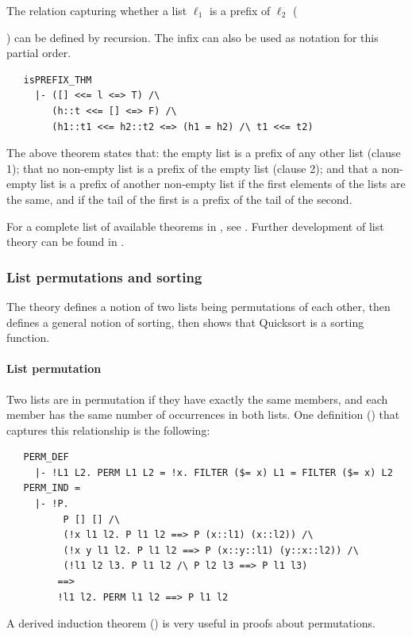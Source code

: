 The relation capturing whether a list $\ell_1$ is a prefix of $\ell_2$
({) can be defined by recursion. The infix
\holtxt{<{}<=} can also be used as notation for this partial order.
%
\begin{hol}
\begin{verbatim}
   isPREFIX_THM
     |- ([] <<= l <=> T) /\
        (h::t <<= [] <=> F) /\
        (h1::t1 <<= h2::t2 <=> (h1 = h2) /\ t1 <<= t2)
\end{verbatim}
\end{hol}
The above theorem states that: the empty list is a prefix of any other
list (clause 1); that no non-empty list is a prefix of the empty list
(clause 2); and that a non-empty list is a prefix of another non-empty
list if the first elements of the lists are the same, and if the tail
of the first is a prefix of the tail of the second.

\vspace{1ex}
\noindent For a complete list of available theorems in
, see \REFERENCE.  Further development of list
theory can be found in \theoryimp{rich\_list}.


\subsubsection{List permutations and sorting}

The \theoryimp{sorting} theory defines a notion of two lists being
permutations of each other, then defines a general notion of sorting,
then shows that Quicksort is a sorting function.

\paragraph{List permutation}

Two lists are in permutation if they have exactly the same members,
and each member has the same number of occurrences in both lists. One
definition (\holtxt{PERM}) that captures this relationship is the
following:
%
\begin{hol}
\begin{verbatim}
   PERM_DEF
     |- !L1 L2. PERM L1 L2 = !x. FILTER ($= x) L1 = FILTER ($= x) L2
   PERM_IND =
     |- !P.
          P [] [] /\
          (!x l1 l2. P l1 l2 ==> P (x::l1) (x::l2)) /\
          (!x y l1 l2. P l1 l2 ==> P (x::y::l1) (y::x::l2)) /\
          (!l1 l2 l3. P l1 l2 /\ P l2 l3 ==> P l1 l3)
         ==>
         !l1 l2. PERM l1 l2 ==> P l1 l2
\end{verbatim}
\end{hol}
%
A derived induction theorem () is very
useful in proofs about permutations.

}

